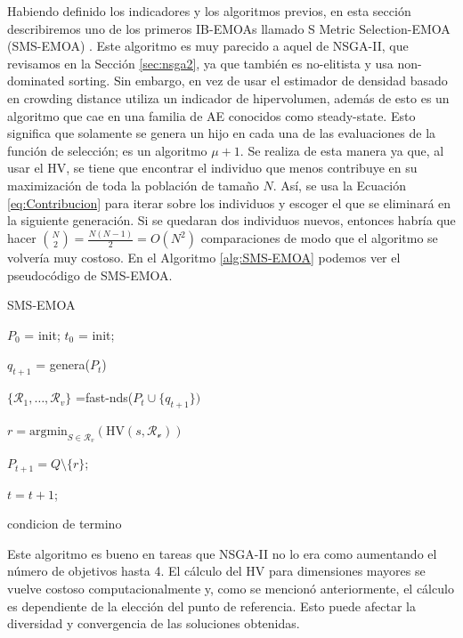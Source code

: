 Habiendo definido los indicadores y los algoritmos previos, en esta sección describiremos uno de los primeros IB-EMOAs llamado S Metric Selection-EMOA (SMS-EMOA) \cite{SMS-EMOA}. Este algoritmo es muy parecido a aquel de NSGA-II, que revisamos en la Sección \ref{sec:nsga2}, ya que también es no-elitista y usa non-dominated sorting. Sin embargo, en vez de usar el estimador de densidad basado en crowding distance utiliza un indicador de hipervolumen, además de esto es un algoritmo que cae en una familia de AE conocidos como steady-state. Esto significa que solamente se genera un hijo en cada una de las evaluaciones de la función de selección; es un algoritmo $\mu+1$. Se realiza de esta manera ya que, al usar el HV, se tiene que encontrar el individuo que menos contribuye en su maximización de toda la población de tamaño $N$. Así, se usa la Ecuación \eqref{eq:Contribucion} para iterar sobre los individuos y escoger el que se eliminará en la siguiente generación. Si se quedaran dos individuos nuevos, entonces habría que hacer $\binom{N}{2}=\frac{N(N-1)}{2}=O(N^2)$ comparaciones de modo que el algoritmo se volvería muy costoso. En el Algoritmo \ref{alg:SMS-EMOA} podemos ver el pseudocódigo de SMS-EMOA.

\begin{algorithm}
    \caption{SMS-EMOA}\label{alg:SMS-EMOA}
    \begin{algorithmic}[1] %
        \State $P_0$ = init;
        \State $t_0$ = init;

        \Repeat
        
        $q_{t+1}$ = genera($P_t$)
        
        $\{\mathcal{R_1},\ldots,\mathcal{R}_v\}$ =fast-nds($P_t \cup \{q_{t+1}\})$
        
        $r=\text{argmin}_{S\in \mathcal{R}_v}\left( \text{HV}(s,\mathcal{R_v}) \right)$
        
        $P_{t+1}= Q \setminus \{r\}$;
        
        $t=t+1$;
        
        \Until condicion de termino

    \end{algorithmic}
\end{algorithm}

Este algoritmo es bueno en tareas que NSGA-II no lo era como aumentando el número de objetivos hasta 4. El cálculo del HV para dimensiones mayores se vuelve costoso computacionalmente y, como se mencionó anteriormente, el cálculo es dependiente de la elección del punto de referencia. Esto puede afectar la diversidad y convergencia de las soluciones obtenidas.

